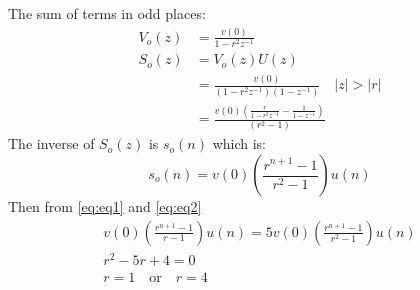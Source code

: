 \documentclass{article}
\begin{document}
The sum of terms in odd places:
\begin{align}
V_o(z) &= \frac{v(0)}{1-r^2z^{-1}} \\
S_o(z) &= V_o(z)U(z) \\
       &= \frac{v(0)}{(1-r^2z^{-1})(1-z^{-1})} \quad \lvert z \rvert > \lvert r \rvert \\
       &= \frac{v(0)\left(\frac{r}{1-r^2z^{-1}}-\frac{1}{1-z^{-1}}\right)}{(r^2-1)}
\end{align}
The inverse of $S_o(z)$ is $s_o(n)$ which is:
\begin{equation}
s_o(n) = v(0)\left(\frac{r^{n+1}-1}{r^2-1}\right)u(n)
\label{eq:eq2}
\end{equation}
Then from \eqref{eq:eq1} and \eqref{eq:eq2}
\begin{align}
v(0)(\frac{r^{n+1}-1}{r-1})u(n)=5v(0)(\frac{r^{n+1}-1}{r^2-1})u(n)\\
r^2-5r+4=0\\
r=1 \quad \text{or} \quad r=4
\end{align}
\end{document}
